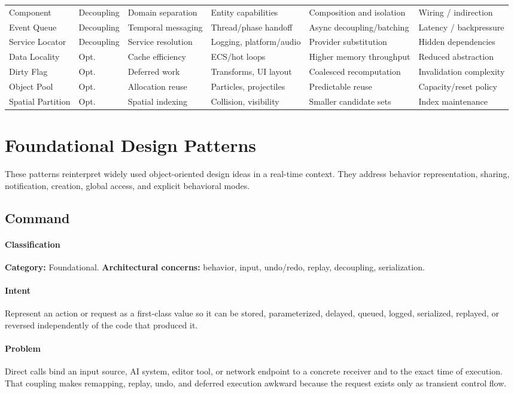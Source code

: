 \documentclass[11pt]{article}
\begin{document}
\begin{longtable}{P{2.10cm}P{1.80cm}P{2.10cm}P{2.50cm}P{2.30cm}P{2.60cm}}
Component & Decoupling & Domain separation & Entity capabilities & Composition and isolation & Wiring / indirection\\
Event Queue & Decoupling & Temporal messaging & Thread/phase handoff & Async decoupling/batching & Latency / backpressure\\
Service Locator & Decoupling & Service resolution & Logging, platform/audio & Provider substitution & Hidden dependencies\\
Data Locality & Opt. & Cache efficiency & ECS/hot loops & Higher memory throughput & Reduced abstraction\\
Dirty Flag & Opt. & Deferred work & Transforms, UI layout & Coalesced recomputation & Invalidation complexity\\
Object Pool & Opt. & Allocation reuse & Particles, projectiles & Predictable reuse & Capacity/reset policy\\
Spatial Partition & Opt. & Spatial indexing & Collision, visibility & Smaller candidate sets & Index maintenance\\
\bottomrule
\end{longtable}
\normalsize
\clearpage
\section{Foundational Design Patterns}\label{sec:foundational}
These patterns reinterpret widely used object-oriented design ideas in a real-time context. They address behavior representation, sharing, notification, creation, global access, and explicit behavioral modes.

\subsection{Command}\label{pat:command}
\paragraph{Classification} \textbf{Category:} Foundational. \textbf{Architectural concerns:} behavior, input, undo/redo, replay, decoupling, serialization.
\paragraph{Intent} Represent an action or request as a first-class value so it can be stored, parameterized, delayed, queued, logged, serialized, replayed, or reversed independently of the code that produced it.
\paragraph{Problem} Direct calls bind an input source, AI system, editor tool, or network endpoint to a concrete receiver and to the exact time of execution. That coupling makes remapping, replay, undo, and deferred execution awkward because the request exists only as transient control flow.
\end{document}
